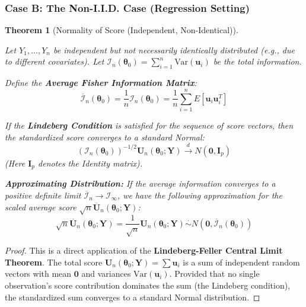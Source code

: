 \documentclass[
  letterpaper,
  DIV=11,
  numbers=noendperiod]{scrreprt}
\renewcommand{\[}{\begin{equation}}
\renewcommand{\]}{\end{equation}}
\theoremstyle{definition}
\theoremstyle{plain}
\theoremstyle{plain}
\theoremstyle{plain}
\newtheorem{theorem}{Theorem}[chapter]
\theoremstyle{definition}
\theoremstyle{plain}
\theoremstyle{remark}
\begin{document}
\subsubsection{Case B: The Non-I.I.D. Case (Regression
Setting)}\label{case-b-the-non-i.i.d.-case-regression-setting}

\begin{theorem}[Normality of Score (Independent,
Non-Identical)]\protect\hypertarget{thm-score-normality-noniid}{}\label{thm-score-normality-noniid}

Let \(Y_1, \dots, Y_n\) be independent but not necessarily identically
distributed (e.g., due to different covariates). Let
\(\mathcal{I}_n(\boldsymbol{\theta}_0) = \sum_{i=1}^n \text{Var}(\mathbf{u}_i)\)
be the total information.

Define the \textbf{Average Fisher Information Matrix}: \[
\overline{\mathcal{I}}_n(\boldsymbol{\theta}_0) = \frac{1}{n} \mathcal{I}_n(\boldsymbol{\theta}_0) = \frac{1}{n} \sum_{i=1}^n E[\mathbf{u}_i \mathbf{u}_i^T]
\]

If the \textbf{Lindeberg Condition} is satisfied for the sequence of
score vectors, then the standardized score converges to a standard
Normal: \[
\left( \mathcal{I}_n(\boldsymbol{\theta}_0) \right)^{-1/2} \mathbf{U}_n(\boldsymbol{\theta}_0; \mathbf{Y}) \xrightarrow{d} N(\mathbf{0}, \mathbf{I}_p)
\] \emph{(Here \(\mathbf{I}_p\) denotes the Identity matrix).}

\textbf{Approximating Distribution:} If the average information
converges to a positive definite limit
\(\overline{\mathcal{I}}_n \to \mathcal{I}_{\infty}\), we have the
following approximation for the scaled average score
\(\sqrt{n} \overline{\mathbf{U}}_n(\boldsymbol{\theta}_0; \mathbf{Y})\):
\[
\sqrt{n} \overline{\mathbf{U}}_n(\boldsymbol{\theta}_0; \mathbf{Y}) = \frac{1}{\sqrt{n}} \mathbf{U}_n(\boldsymbol{\theta}_0; \mathbf{Y}) \overset{\cdot}{\sim} N(\mathbf{0}, \overline{\mathcal{I}}_n(\boldsymbol{\theta}_0))
\]

\end{theorem}

\begin{proof}
This is a direct application of the \textbf{Lindeberg-Feller Central
Limit Theorem}. The total score
\(\mathbf{U}_n(\boldsymbol{\theta}_0; \mathbf{Y}) = \sum \mathbf{u}_i\)
is a sum of independent random vectors with mean \(\mathbf{0}\) and
variances \(\text{Var}(\mathbf{u}_i)\). Provided that no single
observation's score contribution dominates the sum (the Lindeberg
condition), the standardized sum converges to a standard Normal
distribution.
\end{proof}
\end{document}
